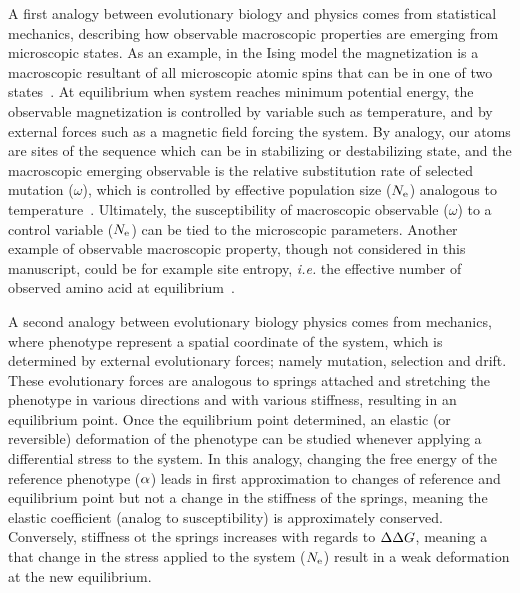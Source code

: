 A first analogy between evolutionary biology and physics comes from statistical mechanics, describing how observable macroscopic properties are emerging from microscopic states.
As an example, in the Ising model the magnetization is a macroscopic resultant of all microscopic atomic spins that can be in one of two states~\citep{Brush1967}.
At equilibrium when system reaches minimum potential energy, the observable magnetization is controlled by variable such as temperature, and by external forces such as a magnetic field forcing the system.
By analogy, our atoms are sites of the sequence which can be in stabilizing or destabilizing state, and the macroscopic emerging observable is the relative substitution rate of selected mutation ($\omega$), which is controlled by effective population size ($N_{\mathrm{e}}$) analogous to temperature~\citep{Sella2005}.
Ultimately, the susceptibility of macroscopic observable ($\omega$) to a control variable ($N_{\mathrm{e}}$) can be tied to the microscopic parameters.
Another example of observable macroscopic property, though not considered in this manuscript, could be for example site entropy, \textit{i.e.} the effective number of observed amino acid at equilibrium~\citep{Goldstein2016, Jimenez2018, Jiang2018}.

A second analogy between evolutionary biology physics comes from mechanics, where phenotype represent a spatial coordinate of the system, which is determined by external evolutionary forces; namely mutation, selection and drift.
These evolutionary forces are analogous to springs attached and stretching the phenotype in various directions and with various stiffness, resulting in an equilibrium point.
Once the equilibrium point determined, an elastic (or reversible) deformation of the phenotype can be studied whenever applying a differential stress to the system.
In this analogy, changing the free energy of the reference phenotype ($\alpha$) leads in first approximation to changes of reference and equilibrium point but not a change in the stiffness of the springs, meaning the elastic coefficient (analog to susceptibility) is approximately conserved.
Conversely, stiffness ot the springs increases with regards to $\Delta \Delta G$, meaning a that change in the stress applied to the system ($N_{\mathrm{e}}$) result in a weak deformation at the new equilibrium.

